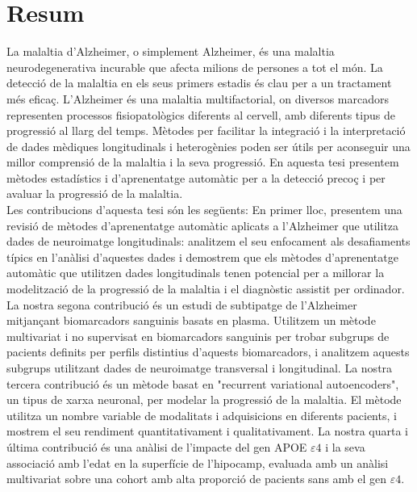 \documentclass[12pt, b5paper,twoside]{tesi_upf}
\begin{document}
\vspace*{\fill}
\section*{\Large \sffamily  Resum}
La malaltia d'Alzheimer, o simplement Alzheimer, és una malaltia neurodegenerativa incurable que afecta milions de persones a tot el món. La detecció de la malaltia en els seus primers estadis és clau per a un tractament més eficaç. L’Alzheimer és una malaltia multifactorial, on diversos marcadors representen processos fisiopatològics diferents al cervell, amb diferents tipus de progressió al llarg del temps. Mètodes per facilitar la integració i la interpretació de dades mèdiques longitudinals i heterogènies poden ser útils per aconseguir una millor comprensió de la malaltia i la seva progressió. En aquesta tesi presentem mètodes estadístics i d’aprenentatge automàtic per a la detecció precoç i per avaluar la progressió de la malaltia. \\

Les contribucions d’aquesta tesi són les següents: En primer lloc, presentem una revisió de mètodes d’aprenentatge automàtic aplicats a l'Alzheimer que utilitza dades de neuroimatge longitudinals: analitzem el seu enfocament als desafiaments típics en l’anàlisi d'aquestes dades i demostrem que els mètodes d’aprenentatge automàtic que utilitzen dades longitudinals tenen potencial per a millorar la modelització de la progressió de la malaltia i el diagnòstic assistit per ordinador. La nostra segona contribució és un estudi de subtipatge de l'Alzheimer mitjançant biomarcadors sanguinis basats en plasma. Utilitzem un mètode multivariat i no supervisat en biomarcadors sanguinis per trobar subgrups de pacients definits per perfils distintius d'aquests biomarcadors, i analitzem aquests subgrups utilitzant dades de neuroimatge transversal i longitudinal. La nostra tercera contribució és un mètode basat en "recurrent variational autoencoders", un tipus de xarxa neuronal, per modelar la progressió de la malaltia. El mètode utilitza un nombre variable de modalitats i adquisicions en diferents pacients, i mostrem el seu rendiment quantitativament i qualitativament. La nostra quarta i última contribució és una anàlisi de l’impacte del gen APOE $\varepsilon4$ i la seva associació amb l’edat en la superfície de l’hipocamp, evaluada amb un anàlisi multivariat sobre una cohort amb alta proporció de pacients sans amb el gen $\varepsilon4$.
\vspace*{\fill}
\end{document}
